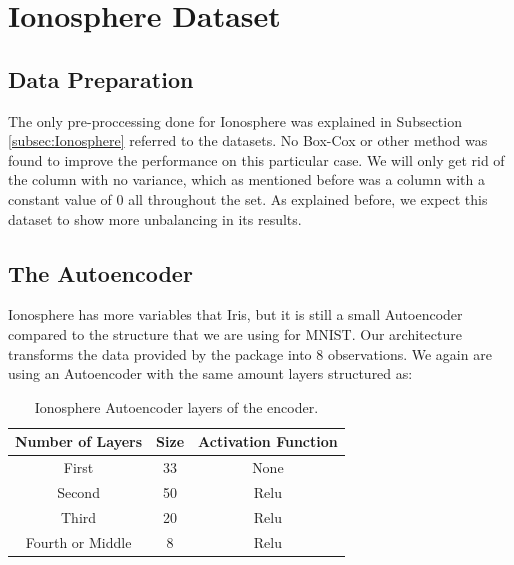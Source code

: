 \section{Ionosphere Dataset}
\subsection{Data Preparation}

The only pre-proccessing done for Ionosphere was explained in Subsection \ref{subsec:Ionosphere} referred to the datasets. No Box-Cox or other method was found to improve the performance on this particular case. We will only get rid of the column with no variance, which as mentioned before was a column with a constant value of 0 all throughout the set. As explained before, we expect this dataset to show more unbalancing in its results.

\subsection{The Autoencoder}

Ionosphere has more variables that Iris, but it is still a small Autoencoder compared to the structure that we are using for MNIST. Our architecture transforms the data provided by the package into 8 observations. We again are using an Autoencoder with the same amount layers structured as:  \newline

\begin{table}[H]
	\caption{Ionosphere Autoencoder layers of the encoder.}
	\begin{center}
		\label{tab:table_Ionosphere_auto_encoder}
		\begin{tabular}{c|c|c} %
			\textbf{Number of Layers} & \textbf{Size} & \textbf{Activation Function} \\
			\hline
			First & 33 & None\\
			Second & 50 & Relu\\
			Third & 20 & Relu\\
			Fourth or Middle & 8 & Relu\\
		\end{tabular}
	\end{center}
\end{table}

